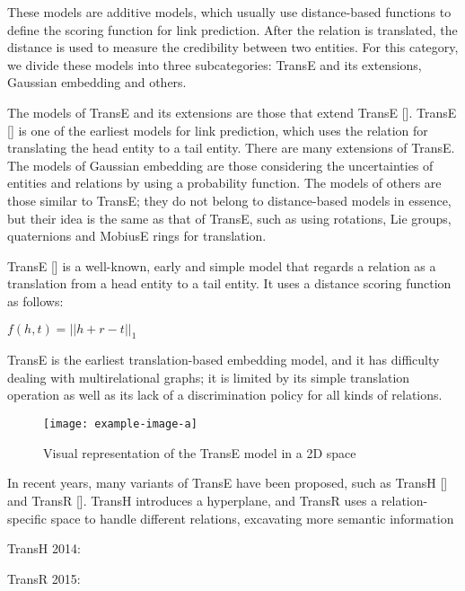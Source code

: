 These models are additive models, which usually use distance-based functions to
define the scoring function for link prediction. After the relation is translated, the distance is used to measure the credibility between two entities. For this category, we divide these models into three subcategories: TransE and its extensions, Gaussian embedding and others.

The models of TransE and its extensions are those that extend TransE []. TransE [] is
one of the earliest models for link prediction, which uses the relation for translating the head entity to a tail entity. There are many extensions of TransE. The models of Gaussian embedding are those considering the uncertainties of entities and relations by using a probability function. The models of others are those similar to TransE; they do not belong to distance-based models in essence, but their idea is the same as that of TransE, such as using rotations, Lie groups, quaternions and MobiusE rings for translation.

TransE [] is a well-known, early and simple model that regards a relation as a translation from a head entity to a tail entity. It uses a distance scoring function as follows:

$f (h, t) = ||h + r - t||_1$

TransE is the earliest translation-based embedding model, and it has difficulty dealing with multirelational graphs; it is limited by its simple translation operation as well as its lack of a discrimination policy for all kinds of relations.

\begin{figure}[!htp]
    \centering
    \texttt{[image: example-image-a]}
    \caption{Visual representation of the TransE model in a 2D space}
    \label{fig:emb-transE}
\end{figure}

In recent years, many variants of TransE have been proposed, such as TransH [] and TransR []. TransH introduces a hyperplane, and TransR uses a relation-specific space to handle different relations, excavating more semantic information

TransH 2014:



TransR 2015:



